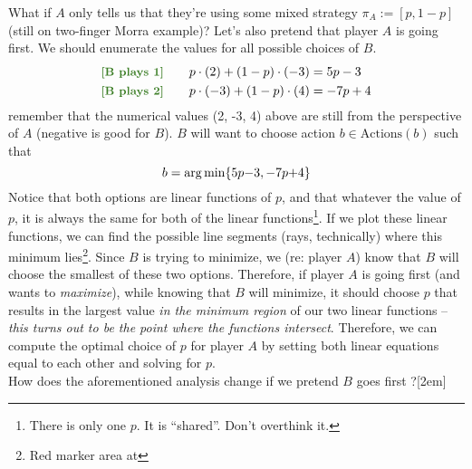 \documentclass[11pt]{article}
\begin{document}
What if $A$ only tells us that they're using some mixed strategy $\pi_A := [p, 1-p]$ (still on two-finger Morra example)? Let's also pretend that player $A$ is going first. We should enumerate the values for all possible choices of $B$.
\begin{align}
	\mtgreen{[B plays 1]}\qquad&
		p \cdot (2) + (1 - p) \cdot (-3) = 5p - 3 \\
	\mtgreen{[B plays 2]}\qquad& 
		p \cdot (-3) + (1 - p) \cdot (4) = -7p + 4
\end{align}
remember that the numerical values (2, -3, 4) above are still from the perspective of $A$ (negative is good for $B$). $B$ will want to choose action $b \in \text{Actions}(b)$ such that
$$
	b = \operatorname*{arg\,min}\{ 5p {-} 3,  -7p {+} 4  \}
$$
Notice that both options are linear functions of $p$, and that whatever the value of $p$, it is always the same for both of the linear functions\footnote{There is only one $p$. It is ``shared''. Don't overthink it.}. If we plot these linear functions, we can find the possible line segments (rays, technically) where this minimum lies\footnote{Red marker area at }. Since $B$ is trying to minimize, we (re: player $A$) know that $B$ will choose the smallest of these two options. Therefore, if player $A$ is going first (and wants to \textit{maximize}), while knowing that $B$ will minimize, it should choose $p$ that results in the largest value \textit{in the minimum region} of our two linear functions -- \textit{this turns out to be the point where the functions intersect}. Therefore, we can compute the optimal choice of $p$ for player $A$ by setting both linear equations equal to each other and solving for $p$. \\

How does the aforementioned analysis change if we pretend $B$ goes first ?[2em]























\label{Review}
\end{document}

